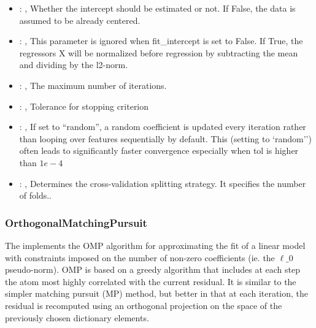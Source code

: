 \begin{itemize}
    \item {}: , 
      Whether the intercept should be estimated or not. If False,
      the data is assumed to be already centered.

    \item {}: , 
      This parameter is ignored when fit\_intercept is set to False. If True,
      the regressors X will be normalized before regression by subtracting the mean and
      dividing by the l2-norm.

    \item {}: , 
      The maximum number of iterations.

    \item {}: , 
      Tolerance for stopping criterion

    \item {}: , 
      If set to ``random'', a random coefficient is updated every iteration
      rather than looping over features sequentially by default. This (setting to `random'')
      often leads to significantly faster convergence especially when tol is higher than $1e-4$

    \item {}: , 
      Determines the cross-validation splitting strategy.
      It specifies the number of folds..
  \end{itemize}


\subsubsection{OrthogonalMatchingPursuit}
  The                          implements the OMP algorithm for
  approximating the fit of a                         linear model with constraints imposed on the
  number of non-zero                         coefficients (ie. the $\ell\_0$ pseudo-norm). OMP is
  based on a greedy                         algorithm that includes at each step the atom most
  highly correlated                         with the current residual. It is similar to the simpler
  matching                         pursuit (MP) method, but better in that at each iteration, the
  residual                         is recomputed using an orthogonal projection on the space of the
  previously chosen dictionary elements.

